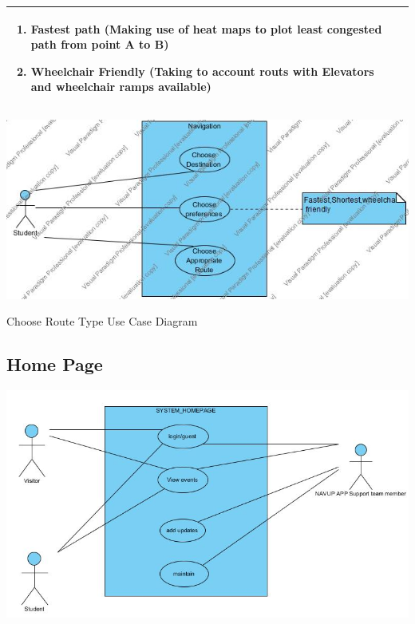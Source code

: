 \documentclass[12pt]{article}
\begin{document}
\begin{tabular}{|p{4cm}|p{10cm}|}
\begin{enumerate}
\begin{enumerate}
	\item Fastest path (Making use of heat maps to plot least congested path from point A to B)

	\item Wheelchair Friendly (Taking to account routs with Elevators and wheelchair ramps available)

	\end{enumerate}

\end{enumerate} \\

\hline



\hline



\end{tabular}



\includegraphics[width=\linewidth]{UseCaseDiagram_ChooseRouteType.jpg}

Choose Route Type Use Case Diagram



	\subsection{Home Page}

	\includegraphics[width=\linewidth]{Home page.jpg}
\end{document}
